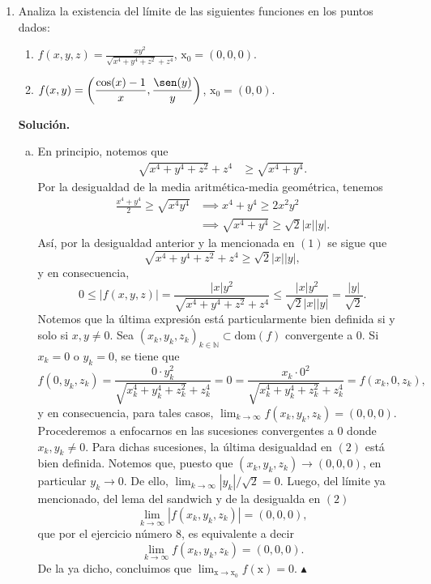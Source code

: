 \documentclass[12pt]{article}
\newcommand{\abs}[1]{\left\vert#1\right\vert}
\newcommand{\N}{\mathbb N}
\newcommand{\x}{\mathrm x}
\begin{document}
\begin{enumerate}
\newpage
\item Analiza la existencia del l\'imite de las siguientes funciones en los puntos dados:
\begin{enumerate}[(1)]
\item $\displaystyle{f(x,y,z) = \frac{xy^2}{\sqrt{x^4+y^4+z^2}+z^4}}$, $\x_0=(0,0,0)$.
\item $\displaystyle{f(x,y) = \left( \frac{\cos(x)-1}{x}, \frac{\sen(y)}{y} \right)}$, 
$\x_0=(0,0)$.
\end{enumerate}
\textbf{Solución.}
\begin{enumerate}[(a)]
    \item En principio, notemos que
    \begin{align*}
        \sqrt{x^4+y^4+z^2} + z^4  &\geq \sqrt{x^4+y^4}. \tag{1}
    \end{align*}
    Por la desigualdad de la media aritmética-media geométrica, tenemos
    \begin{align*}
        \frac{x^4+y^4}{2}\geq \sqrt{x^4y^4} &\implies x^4+y^4 \geq 2x^2y^2 \\
        &\implies \sqrt{x^4+y^4} \geq \sqrt{2}\abs{x}\abs{y}.
    \end{align*}
    Así, por la desigualdad anterior y la mencionada en $(1)$ se sigue que
    \[
        \sqrt{x^4+y^4+z^2} + z^4 \geq \sqrt{2}\abs{x}\abs{y},
    \]
    y en consecuencia,
    \[
    0\leq \abs{f(x,y,z)} = \frac{\abs{x}y^2}{\sqrt{x^4+y^4+z^2} + z^4} \leq \frac{\abs{x}y^2}{\sqrt{2}\abs{x}\abs{y}} = \frac{\abs{y}}{\sqrt{2}}. \tag{2}
    \]
    Notemos que la última expresión está particularmente bien definida si y solo si $x,y\neq 0$. Sea $(x_k,y_k,z_k)_{k\in \N}\subset \text{dom}(f)$ convergente a 0.
    Si $x_k=0$ o $y_k=0$, se tiene que
    \[
    f(0,y_k,z_k)= \frac{0\cdot y_k^2}{\sqrt{x_k^4+y_k^4+z_k^2} + z_k^4} = 0 = \frac{x_k\cdot 0^2}{\sqrt{x_k^4+y_k^4+z_k^2} + z_k^4} = f(x_k,0,z_k),
    \]
    y en consecuencia, para tales casos, $\lim_{k\to \infty}f(x_k,y_k,z_k)=(0,0,0)$. Procederemos a enfocarnos en las sucesiones convergentes a 0 donde $x_k,y_k\neq 0$.
    Para dichas sucesiones, la última desigualdad en $(2)$ está bien definida. Notemos que, puesto que $(x_k,y_k,z_k)\rightarrow (0,0,0)$, en particular $y_k \rightarrow 0$.
    De ello, $\lim_{k\to \infty}\abs{y_k}/\sqrt{2}=0$. Luego, del límite ya mencionado, del lema del sandwich y de la desigualda en $(2)$
    \[
    \lim_{k\to \infty}\abs{f(x_k,y_k,z_k)}=(0,0,0),
    \]
    que por el ejercicio número 8, es equivalente a decir
    \[
    \lim_{k\to \infty}f(x_k,y_k,z_k)=(0,0,0).
    \]
    De la ya dicho, concluimos que $\lim_{\x\to \x_0}f(\x)=0$. \hfill $\blacktriangle$



\end{enumerate}
\end{enumerate}
\end{document}
